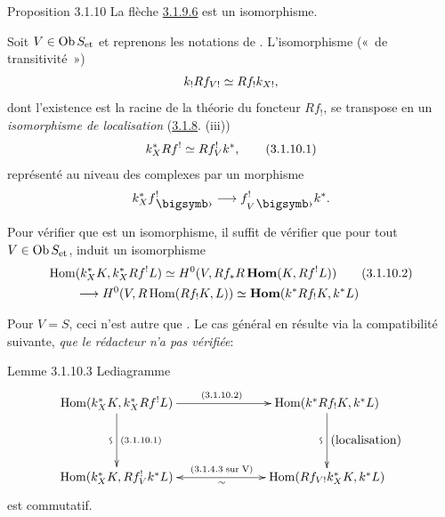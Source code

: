 \documentclass[10pt]{../fichiers-configuration-latex/smfart}
\begin{document}
\begin{enonce*}{Proposition 3.1.10}
La flèche \hyperref[XVIII.eq3.1.9.6]{3.1.9.6} est un isomorphisme.
\end{enonce*}

Soit $V\in \operatorname{Ob} S_{\text{\rm et}}$ et reprenons les notations de
. L'isomorphisme (« de transitivité »)
$$
k_{!}Rf_{V!}\simeq Rf_{!}k_{X!}{},
$$
dont l'existence est la racine de la théorie du foncteur $Rf_{!}$, se
transpose en un \emph{isomorphisme de localisation} (\hyperref[XVIII.prop3.1.8]{3.1.8}. (iii))
\begin{equation*}
k^{\ast}_{X}Rf^{!}\simeq Rf^{!}_{V}k^{\ast}{},\tag{3.1.10.1}
\end{equation*}%
représenté au niveau des complexes par un morphisme
$$
k^{\ast}_{X}f^{!}_{\bigdot}\longrightarrow f^{!}_{V\bigdot}k^{\ast}{\quoi}.
$$

Pour vérifier que  est un isomorphisme, il suffit de vérifier
que pour tout $V\in \operatorname{Ob} S_{\text{\rm et}}$,  induit un
isomorphisme 
\begin{align*}
\operatorname{Hom} &(k^{\ast}_{X}K,k^{\ast}_{X}Rf^{!}L)\simeq
 H^{0}(V,Rf_{\ast}R\operatorname{\mathbf{Hom}} (K,Rf^{!}L))\tag{3.1.10.2}\\
& \longrightarrow H^{0}(V,R\operatorname{Hom}(Rf_{!}K,L))\simeq
 \operatorname{\mathbf{Hom}}(k^{\ast}Rf_{!}K,k^{\ast}L)
\end{align*}

Pour $V=S$, ceci n'est autre que . Le cas général en résulte
via la compatibilité suivante, \emph{que le rédacteur n'a pas vérifiée}:

\begin{enonce*}{Lemme 3.1.10.3}
Le\pageoriginale diagramme
$$
\xymatrix@C=2.5cm@R=1.5cm{
\Hom(k^{\ast}_XK, k^{\ast}_XRf^{!}L)
\ar[r]^{\scriptstyle{(3.1.10.2)}} \ar[d]^{\scriptstyle{(3.1.10.1)}}_{\text{\rotatebox{90}{$\backsim$}}}&
\Hom(k^{\ast}Rf_!K,k^{\ast}L) \ar[d]^{\txt{\rm (localisation)}}_{\text{\rotatebox{90}{$\backsim$}}}\\
\Hom(k^{\ast}_XK, Rf^{!}_Vk^{\ast}L)
\ar@{<->}[r]^{\scriptstyle{\rm{(3.1.4.3\; sur\; V)}}}_{\sim}& \Hom(Rf_{V!}k^{\ast}_XK,k^{\ast}L)
}
$$
est commutatif.
\end{enonce*}

\setcounter{subsubsection}{10}
\end{document}
